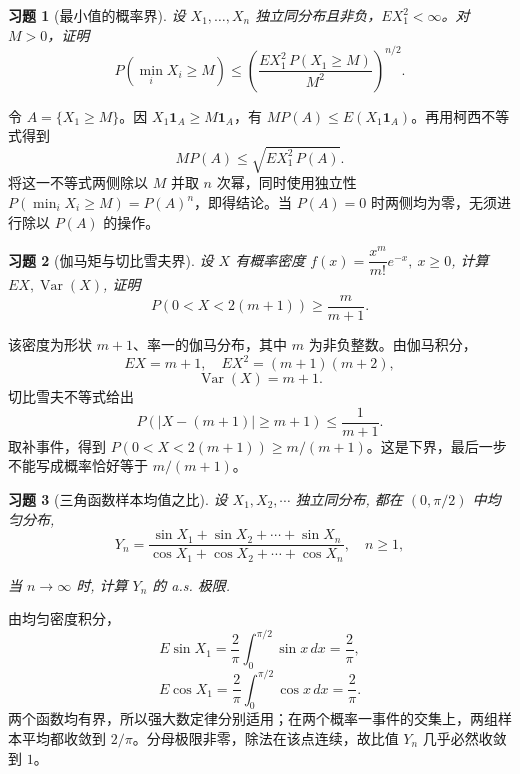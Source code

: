 \documentclass[UTF8,12pt,a4paper,fontset=fandol]{ctexart}
\newtheorem{exercise}{习题}[section]
\begin{document}
\begin{exercise}[最小值的概率界]\label{q:A7.4}
设 $X_1,\ldots,X_n$ 独立同分布且非负，$EX_1^2<\infty$。对 $M>0$，证明\[P(\min_iX_i\ge M)\le\left(\frac{EX_1^2\,P(X_1\ge M)}{M^2}\right)^{n/2}.\]\par{}
\end{exercise}

\begin{solve}\label{a:A7.4}令 $A=\{X_1\ge M\}$。因 $X_1\mathbf1_A\ge M\mathbf1_A$，有 $MP(A)\le E(X_1\mathbf1_A)$。再用柯西不等式得到\[MP(A)\le\sqrt{EX_1^2\,P(A)}.\]将这一不等式两侧除以 $M$ 并取 $n$ 次幂，同时使用独立性 $P(\min_iX_i\ge M)=P(A)^n$，即得结论。当 $P(A)=0$ 时两侧均为零，无须进行除以 $P(A)$ 的操作。\end{solve}

\begin{exercise}[伽马矩与切比雪夫界]\label{q:A7.5}
设 $X$ 有概率密度 $f(x)=\dfrac{x^m}{m!}e^{-x},\ x\geq0$, 计算 $EX,\operatorname{Var}(X)$, 证明
    \[P(0<X<2(m+1))\geq\dfrac{m}{m+1}.\]\par{}
\end{exercise}

\begin{solve}\label{a:A7.5}该密度为形状 $m+1$、率一的伽马分布，其中 $m$ 为非负整数。由伽马积分，\[EX=m+1,\quad EX^2=(m+1)(m+2),\]\[\operatorname{Var}(X)=m+1.\]切比雪夫不等式给出\[P(|X-(m+1)|\ge m+1)\le\frac1{m+1}.\]取补事件，得到 $P(0<X<2(m+1))\ge m/(m+1)$。这是下界，最后一步不能写成概率恰好等于 $m/(m+1)$。\end{solve}

\begin{exercise}[三角函数样本均值之比]\label{q:A7.10}
设 $X_1,X_2,\cdots$ 独立同分布, 都在 $(0,\pi/2)$ 中均匀分布,
    \[Y_n=\dfrac{\sin X_1+\sin X_2+\cdots+\sin X_n}{\cos X_1+\cos X_2+\cdots+\cos X_n},\quad n\geq1,\]
    
    当 $n\to\infty$ 时, 计算 $Y_n$ 的 a.s. 极限.\par{}
\end{exercise}

\begin{solve}\label{a:A7.10}由均匀密度积分，\[E\sin X_1=\frac2\pi\int_0^{\pi/2}\sin x\,dx=\frac2\pi,\]\[E\cos X_1=\frac2\pi\int_0^{\pi/2}\cos x\,dx=\frac2\pi.\]两个函数均有界，所以强大数定律分别适用；在两个概率一事件的交集上，两组样本平均都收敛到 $2/\pi$。分母极限非零，除法在该点连续，故比值 $Y_n$ 几乎必然收敛到 $1$。\end{solve}
\end{document}
